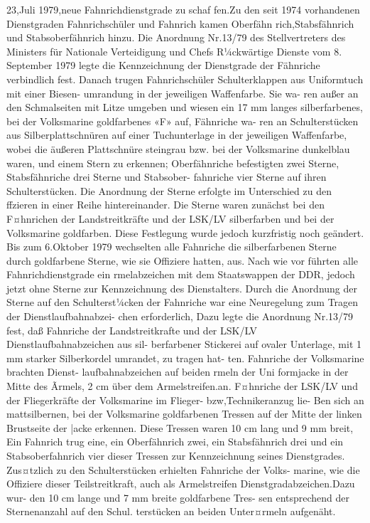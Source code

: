 23,Juli 1979,neue Fahnrichdienstgrade zu schaf
fen.Zu den seit 1974 vorhandenen Dienstgraden
Fahnrichschüler und Fahnrich kamen Oberfähn
rich,Stabsfähnrich und Stabsoberfähnrich hinzu.
Die Anordnung Nr.13/79 des Stellvertreters des
Ministers für Nationale Verteidigung und Chefs
R¼ckwärtige Dienste vom 8. September 1979 legte
die Kennzeichnung der Dienstgrade der Fähnriche verbindlich fest. Danach trugen Fahnrichschüler
Schulterklappen aus Uniformtuch mit einer Biesen-
umrandung in der jeweiligen Waffenfarbe. Sie wa-
ren außer an den Schmalseiten mit Litze umgeben
und wiesen ein 17 mm langes silberfarbenes, bei der
Volksmarine goldfarbenes «F» auf, Fähnriche wa-
ren an Schulterstücken aus Silberplattschnüren auf
einer Tuchunterlage in der jeweiligen Waffenfarbe,
wobei die äußeren Plattschnüre steingrau bzw. bei
der Volksmarine dunkelblau waren, und einem
Stern zu erkennen; Oberfähnriche befestigten zwei
Sterne, Stabsfähnriche drei Sterne und Stabsober-
fahnriche vier Sterne auf ihren Schulterstücken.
Die Anordnung der Sterne erfolgte im Unterschied
zu den ffzieren in einer Reihe hintereinander.
Die Sterne waren zunächst bei den F¤hnrichen der
Landstreitkräfte und der LSK/LV silberfarben und
bei der Volksmarine goldfarben. Diese Festlegung
wurde jedoch kurzfristig noch geändert. Bis zum
6.Oktober 1979 wechselten alle Fahnriche die silberfarbenen Sterne durch goldfarbene Sterne, wie
sie Offiziere hatten, aus.
Nach wie vor führten alle Fahnrichdienstgrade
ein rmelabzeichen mit dem Staatswappen der
DDR, jedoch jetzt ohne Sterne zur Kennzeichnung
des Dienstalters. Durch die Anordnung der Sterne
auf den Schulterst¼cken der Fahnriche war eine
Neuregelung zum Tragen der Dienstlaufbahnabzei-
chen erforderlich, Dazu legte die Anordnung
Nr.13/79 fest, daß Fahnriche der Landstreitkrafte
und der LSK/LV Dienstlaufbahnabzeichen aus sil-
berfarbener Stickerei auf ovaler Unterlage, mit
1 mm starker Silberkordel umrandet, zu tragen hat-
ten. Fahnriche der Volksmarine brachten Dienst-
laufbahnabzeichen auf beiden rmeln der Uni
formjacke in der Mitte des Ãrmels, 2 cm über dem
Armelstreifen.an.
F¤hnriche der LSK/LV und der Fliegerkräfte der
Volksmarine im Flieger- bzw,Technikeranzug lie-
Ben sich an mattsilbernen, bei der Volksmarine
goldfarbenen Tressen auf der Mitte der linken
Brustseite der |acke erkennen. Diese Tressen waren
10 cm lang und 9 mm breit, Ein Fahnrich trug eine,
ein Oberfähnrich zwei, ein Stabsfähnrich drei und
ein Stabsoberfahnrich vier dieser Tressen zur
Kennzeichnung seines Dienstgrades. Zus¤tzlich zu
den Schulterstücken erhielten Fahnriche der Volks-
marine, wie die Offiziere dieser Teilstreitkraft, auch
als Armelstreifen Dienstgradabzeichen.Dazu wur-
den 10 cm lange und 7 mm breite goldfarbene Tres-
sen entsprechend der Sternenanzahl auf den Schul.
terstücken an beiden Unter¤rmeln aufgenäht.